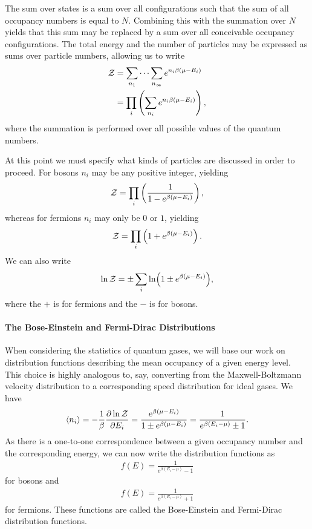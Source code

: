 The sum over states is a sum over all configurations such that the sum of all occupancy numbers is equal to $N$. Combining this with the summation over $N$ yields that this sum may be replaced by a sum over all conceivable occupancy configurations. The total energy and the number of particles may be expressed as sums over particle numbers, allowing us to write
\begin{align*}
	\mathcal{Z} &= \sum\limits_{n_{1}}\dots\sum\limits_{n_{\infty}}e^{n_{i}\beta(\mu - E_{i})} \\
	   &= \prod\limits_{i}\left(\sum\limits_{n_{i}}e^{n_{i}\beta(\mu - E_{i})}\right),
\end{align*}
where the summation is performed over all possible values of the quantum numbers.

At this point we must specify what kinds of particles are discussed in order to proceed. For bosons $n_{i}$ may be any positive integer, yielding
\begin{align*}
	\mathcal{Z} = \prod\limits_{i}\left(\frac{1}{1 - e^{\beta(\mu - E_{i})}}\right),
\end{align*}
whereas for fermions $n_{i}$ may only be $0$ or $1$, yielding
\begin{align*}
	\mathcal{Z} = \prod\limits_{i}\left(1 + e^{\beta(\mu - E_{i})}\right).
\end{align*}
We can also write
\begin{align*}
	\ln{\mathcal{Z}} = \pm\sum\limits_{i}\ln(1 \pm e^{\beta(\mu - E_{i})}),
\end{align*}
where the $+$ is for fermions and the $-$ is for bosons.

\paragraph{The Bose-Einstein and Fermi-Dirac Distributions}
When considering the statistics of quantum gases, we will base our work on distribution functions describing the mean occupancy of a given energy level. This choice is highly analogous to, say, converting from the Maxwell-Boltzmann velocity distribution to a corresponding speed distribution for ideal gases. We have
\begin{align*}
	\expval{n_{i}} = -\frac{1}{\beta}\pdv{\ln{\mathcal{Z}}}{E_{i}} = \frac{e^{\beta(\mu - E_{i})}}{1 \pm e^{\beta(\mu - E_{i})}} = \frac{1}{e^{\beta(E_{i} - \mu)} \pm 1}.
\end{align*}
As there is a one-to-one correspondence between a given occupancy number and the corresponding energy, we can now write the distribution functions as
\begin{align*}
	f(E) = \frac{1}{e^{\beta(E_{i} - \mu)} - 1}
\end{align*}
for bosons and
\begin{align*}
	f(E) = \frac{1}{e^{\beta(E_{i} - \mu)} + 1}
\end{align*}
for fermions. These functions are called the Bose-Einstein and Fermi-Dirac distribution functions.

